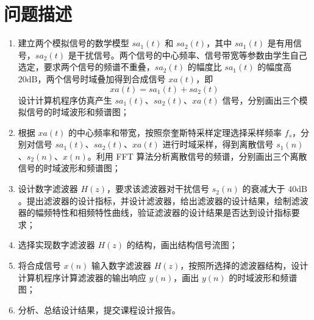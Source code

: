 \documentclass[12pt,AutoFakeBold]{article}
\begin{document}
\maketitle
\setcounter{tocdepth}{2}

\tableofcontents  %

\makeatletter
\begin{center}
    \LARGE \textbf{\textsf{\@problem}}
\end{center}
\makeatother


\section{问题描述}

\begin{enumerate}[(1)]
\item 建立两个模拟信号的数学模型 $sa_1(t)$ 和 $sa_2(t)$，其中 $sa_1(t)$ 是有用信号，$sa_2(t)$ 是干扰信号。两个信号的中心频率、信号带宽等参数由学生自己选定，要求两个信号的频谱不重叠，$sa_2(t)$ 的幅度比 $sa_1(t)$ 的幅度高 $20\mathrm{dB}$，两个信号时域叠加得到合成信号 $xa(t)$，即
%
\begin{equation*}
xa(t)=sa_1(t)+sa_2(t)
\end{equation*}
%
设计计算机程序仿真产生 $sa_1(t)$、$sa_2(t)$、$xa(t)$ 信号，分别画出三个模拟信号的时域波形和频谱图；

\item 根据 $xa(t)$ 的中心频率和带宽，按照奈奎斯特采样定理选择采样频率 $f_s$，分别对信号 $sa_1(t)$、$sa_2(t)$、$xa(t)$ 进行时域采样，得到离散信号 $s_1(n)$、$s_2(n)$、$x(n)$。利用 FFT 算法分析离散信号的频谱，分别画出三个离散信号的时域波形和频谱图；

\item 设计数字滤波器 $H(z)$，要求该滤波器对干扰信号 $s_2(n)$ 的衰减大于 $40\mathrm{dB}$。提出滤波器的设计指标，并设计滤波器，给出滤波器的设计结果，绘制滤波器的幅频特性和相频特性曲线，验证滤波器的设计结果是否达到设计指标要求；

\item 选择实现数字滤波器 $H(z)$ 的结构，画出结构信号流图；

\item 将合成信号 $x(n)$ 输入数字滤波器 $H(z)$，按照所选择的滤波器结构，设计计算机程序计算滤波器的输出响应 $y(n)$，画出 $y(n)$ 的时域波形和频谱图；

\item 分析、总结设计结果，提交课程设计报告。
\end{enumerate}
\end{document}

